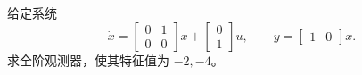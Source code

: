 \documentclass[11pt]{article}
\begin{document}

\begin{problem}[原题 1]
给定系统
\[
 \dot x=\begin{bmatrix}0&1\\0&0\end{bmatrix}x+
 \begin{bmatrix}0\\1\end{bmatrix}u,
 \qquad y=\begin{bmatrix}1&0\end{bmatrix}x.
\]
求全阶观测器，使其特征值为 $-2,-4$。
\end{problem}
\end{document}
